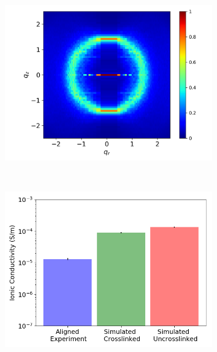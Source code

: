 \documentclass[journal=jpcbfk,manusciprt=article]{achemso}
\begin{document}
  \begin{figure}
  \centering
  \begin{subfigure}{0.45\textwidth}
	\centering
	\includegraphics[width=\textwidth]{rzplot_xlink.png}
	\caption{}~\label{fig:rzplot_xlink}
  \end{subfigure}
  \begin{subfigure}{0.45\textwidth}
	\centering
	\includegraphics[width=\textwidth]{IC_xlink.png}
	\caption{}~\label{fig:IC_xlink}
  \end{subfigure}
  \begin{subfigure}{0.45\textwidth}
	\centering

\end{subfigure}
\end{figure}
\end{document}
